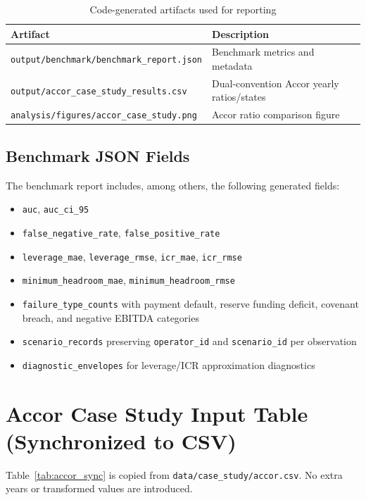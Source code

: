 ﻿\documentclass[11pt,a4paper]{article}
\begin{document}
\begin{table}[H]
\centering
\caption{Code-generated artifacts used for reporting}
\begin{tabular}{ll}
\toprule
Artifact & Description \\
\midrule
\texttt{output/benchmark/benchmark\_report.json} & Benchmark metrics and metadata \\
\texttt{output/accor\_case\_study\_results.csv} & Dual-convention Accor yearly ratios/states \\
\texttt{analysis/figures/accor\_case\_study.png} & Accor ratio comparison figure \\
\bottomrule
\end{tabular}
\end{table}

\subsection*{Benchmark JSON Fields}

The benchmark report includes, among others, the following generated fields:
\begin{itemize}
\item \texttt{auc}, \texttt{auc\_ci\_95}
\item \texttt{false\_negative\_rate}, \texttt{false\_positive\_rate}
\item \texttt{leverage\_mae}, \texttt{leverage\_rmse}, \texttt{icr\_mae}, \texttt{icr\_rmse}
\item \texttt{minimum\_headroom\_mae}, \texttt{minimum\_headroom\_rmse}
\item \texttt{failure\_type\_counts} with payment default, reserve funding deficit, covenant breach, and negative EBITDA categories
\item \texttt{scenario\_records} preserving \texttt{operator\_id} and \texttt{scenario\_id} per observation
\item \texttt{diagnostic\_envelopes} for leverage/ICR approximation diagnostics
\end{itemize}

\section{Accor Case Study Input Table (Synchronized to CSV)}

Table~\ref{tab:accor_sync} is copied from \texttt{data/case\_study/accor.csv}. No extra years or transformed values are introduced.
\end{document}

